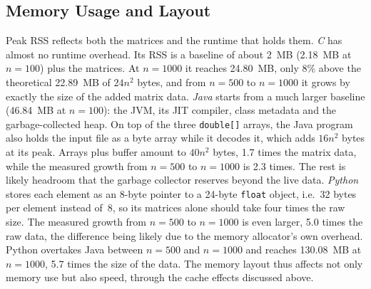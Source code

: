 \documentclass[conference,a4paper]{IEEEtran}
\newcommand{\code}[1]{\texttt{#1}}
\begin{document}
\subsection{Memory Usage and Layout}
\label{sec:disc-memory}
Peak RSS reflects both the matrices and the runtime that holds them.
\emph{C} has almost no runtime overhead. Its RSS is a baseline of about 2~MB
(2.18~MB at $n=100$) plus the matrices. At $n=1000$ it reaches 24.80~MB, only
8\% above the theoretical 22.89~MB of $24n^2$ bytes, and from $n=500$ to
$n=1000$ it grows by exactly the size of the added matrix data.
\emph{Java} starts from a much larger baseline (46.84~MB at $n=100$): the JVM,
its JIT compiler, class metadata and the garbage-collected heap. On top of the
three \code{double[]} arrays, the Java program also holds the input file as a
byte array while it decodes it, which adds $16n^2$ bytes at its peak. Arrays
plus buffer amount to $40n^2$ bytes, 1.7 times the matrix data, while the
measured growth from $n=500$ to $n=1000$ is 2.3 times. The rest is likely
headroom that the garbage collector reserves beyond the live data.
\emph{Python} stores each element as an 8-byte pointer to a 24-byte \code{float}
object, i.e.\ 32 bytes per element instead of~8, so its matrices alone should
take four times the raw size. The measured growth from $n=500$ to $n=1000$ is
even larger, 5.0 times the raw data, the difference being likely due to the
memory allocator's own overhead. Python overtakes Java between $n=500$ and
$n=1000$ and reaches 130.08~MB at $n=1000$, 5.7 times the size of the data.
The memory layout thus affects not only memory use but also speed, through the
cache effects discussed above.
\end{document}
